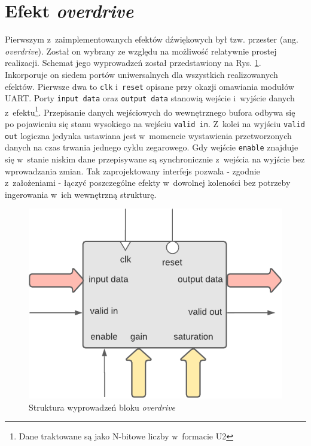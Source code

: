 \section{Efekt \textit{overdrive}}

Pierwszym z~zaimplementowanych efektów dźwiękowych był tzw. przester (ang. \textit{overdrive}). Został on wybrany ze względu na możliwość relatywnie prostej realizacji. Schemat jego wyprowadzeń został przedstawiony na Rys. \ref{overdrive-structure}. Inkorporuje on siedem portów uniwersalnych dla wszystkich realizowanych efektów. Pierwsze dwa to \verb|clk| i~\verb|reset| opisane przy okazji omawiania modułów UART. Porty \verb|input data| oraz \verb|output data| stanowią wejście i~wyjście danych z~efektu\footnote{Dane traktowane są jako N-bitowe liczby w~formacie U2}. Przepisanie danych wejściowych do wewnętrznego bufora odbywa się po pojawieniu się stanu wysokiego na wejściu \verb|valid in|. Z~kolei na wyjściu \verb|valid out| logiczna jedynka ustawiana jest w~momencie wystawienia przetworzonych danych na czas trwania jednego cyklu zegarowego. Gdy wejście \verb|enable| znajduje się w~stanie niskim dane przepisywane są synchronicznie z~wejścia na wyjście bez wprowadzania zmian. Tak zaprojektowany interfejs pozwala - zgodnie z~założeniami - łączyć poszczególne efekty w~dowolnej koleności bez potrzeby ingerowania w~ich wewnętrzną strukturę.

\vspace{0.5cm}
\begin{figure}[ht]
    \centering
    \includegraphics[scale=0.75]{img/diagrams/overdrive.pdf}
    \captionsetup{format=plain,justification=centering}
    \caption{Struktura wyprowadzeń bloku \textit{overdrive}}
    \label{overdrive-structure}
\end{figure}
\vspace{0.5cm}

